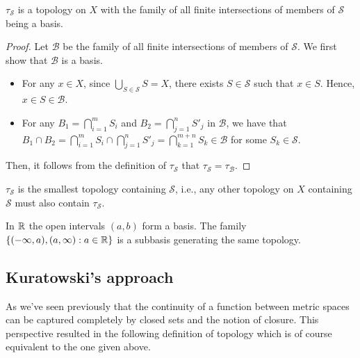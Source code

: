 \begin{theorem}
  ${\tau}_{\mathcal{S}}$ is a topology on $X$ with the family of all finite intersections of members of $\mathcal{S}$ being a basis.
\end{theorem}
\begin{proof}
  Let $\mathcal{B}$ be the family of all finite intersections of members of $\mathcal{S}$. We first show that $\mathcal{B}$ is a basis. 

  \begin{itemize}
    \item For any $x\in X$, since $\bigcup_{S\in\mathcal{S}} S = X$, there exists $S\in\mathcal{S}$ such that $x\in S$. Hence, $x\in S\in\mathcal{B}$.
    \item For any $B_1=\bigcap_{i=1}^m S_i$ and $B_2=\bigcap_{j=1}^n S'_j$ in $\mathcal{B}$, we have that $B_1\cap B_2 = \bigcap_{i=1}^m S_i \cap \bigcap_{j=1}^n S'_j = \bigcap_{k=1}^{m+n} S_k\in \mathcal{B}$ for some $S_k\in\mathcal{S}$.
  \end{itemize}
  Then, it follows from the definition of $\tau_\mathcal{S}$ that ${\tau}_{\mathcal{S}}={\tau}_{\mathcal{B}}$.
\end{proof}

\begin{remark}
  ${\tau}_{\mathcal{S}}$ is the smallest topology containing $\mathcal{S}$, i.e., any other topology on $X$ containing $\mathcal{S}$ must also contain ${\tau}_{\mathcal{S}}$.
\end{remark}

\begin{example}
In $\mathbb{R}$ the open intervals $(a,b)$ form a basis. The family $\{(-\infty,a), (a,\infty): a\in\mathbb{R}\}$ is a subbasis generating the same topology.
\end{example}





\subsection{Kuratowski's approach}

As we've seen previously that the continuity of a function between metric spaces can be captured completely by closed sets and the notion of closure. This perspective resulted in the following definition of topology which is of course equivalent to the one given above.



